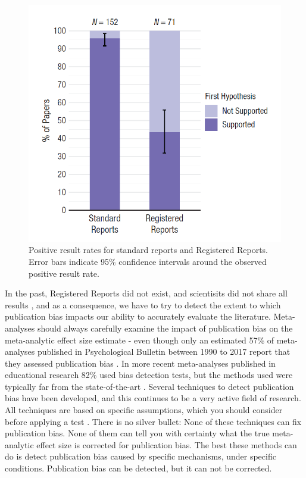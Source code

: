 \documentclass[
  oneside]{book}
\begin{document}
\begin{figure}

{\centering \includegraphics[width=0.75\linewidth]{images/scheel} 

}

\caption{Positive result rates for standard reports and Registered Reports. Error bars indicate 95\% confidence intervals around the observed positive result rate.}\label{fig:scheel}
\end{figure}

In the past, Registered Reports did not exist, and scientisits did not share all results \citep{franco_publication_2014, greenwald_consequences_1975, sterling_publication_1959}, and as a consequence, we have to try to detect the extent to which publication bias impacts our ability to accurately evaluate the literature. Meta-analyses should always carefully examine the impact of publication bias on the meta-analytic effect size estimate - even though only an estimated 57\% of meta-analyses published in Psychological Bulletin between 1990 to 2017 report that they assessed publication bias \citep{polanin_transparency_2020}. In more recent meta-analyses published in educational research 82\% used bias detection tests, but the methods used were typically far from the state-of-the-art \citep{ropovik_neglect_2021}. Several techniques to detect publication bias have been developed, and this continues to be a very active field of research. All techniques are based on specific assumptions, which you should consider before applying a test \citep{carter_correcting_2019}. There is no silver bullet: None of these techniques can fix publication bias. None of them can tell you with certainty what the true meta-analytic effect size is corrected for publication bias. The best these methods can do is detect publication bias caused by specific mechanisms, under specific conditions. Publication bias can be detected, but it can not be corrected.
\end{document}
